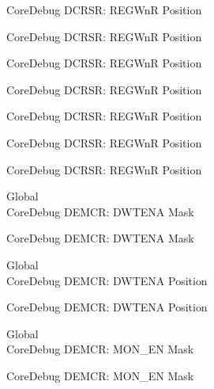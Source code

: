 \begin{DoxyRefList}
\label{deprecated__deprecated000129}%
%
Core\+Debug DCRSR\+: REGWnR Position 

\label{deprecated__deprecated000185}%
%
Core\+Debug DCRSR\+: REGWnR Position 

\label{deprecated__deprecated000268}%
%
Core\+Debug DCRSR\+: REGWnR Position 

\label{deprecated__deprecated000327}%
%
Core\+Debug DCRSR\+: REGWnR Position 

\label{deprecated__deprecated000403}%
%
Core\+Debug DCRSR\+: REGWnR Position 

\label{deprecated__deprecated000492}%
%
Core\+Debug DCRSR\+: REGWnR Position 

\label{deprecated__deprecated000594}%
%
Core\+Debug DCRSR\+: REGWnR Position  
\item[Global \doxylink{group___c_m_s_i_s___core_debug_ga2fcc0b8f174e85379d38e1cb74b8c627}{Core\+Debug\+\_\+\+DEMCR\+\_\+\+DWTENA\+\_\+\+Msk} ]\hfill \\
\label{deprecated__deprecated000134}%
%
Core\+Debug DEMCR\+: DWTENA Mask 

\label{deprecated__deprecated000273}%
%
Core\+Debug DEMCR\+: DWTENA Mask  
\item[Global \doxylink{group___c_m_s_i_s___core_debug_ga0cde79c4e741e1eed0513c1f985baeb9}{Core\+Debug\+\_\+\+DEMCR\+\_\+\+DWTENA\+\_\+\+Pos} ]\hfill \\
\label{deprecated__deprecated000133}%
%
Core\+Debug DEMCR\+: DWTENA Position 

\label{deprecated__deprecated000272}%
%
Core\+Debug DEMCR\+: DWTENA Position  
\item[Global \doxylink{group___c_m_s_i_s___core_debug_gac2b46b9b65bf8d23027f255fc9641977}{Core\+Debug\+\_\+\+DEMCR\+\_\+\+MON\+\_\+\+EN\+\_\+\+Msk} ]\hfill \\
\label{deprecated__deprecated000054}%
%
Core\+Debug DEMCR\+: MON\+\_\+\+EN Mask 

\label{deprecated__deprecated000198}%
%
Core\+Debug DEMCR\+: MON\+\_\+\+EN Mask 


\end{DoxyRefList}
